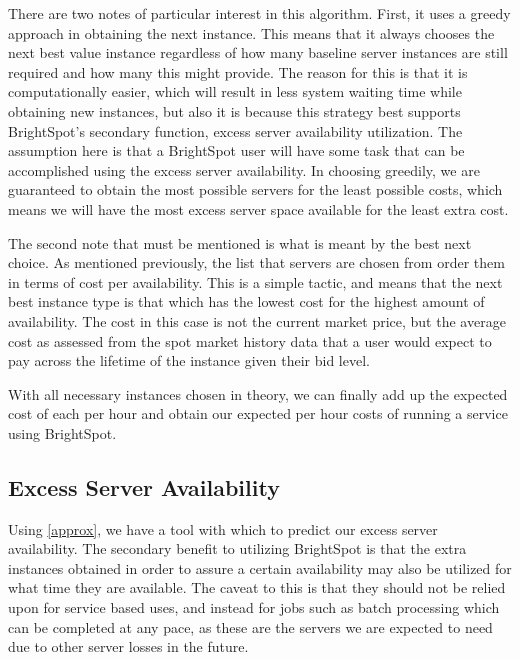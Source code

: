 \documentclass[thesis,proposal]{umassthesis}  %
\begin{document}
There are two notes of particular interest in this algorithm. First, it uses a greedy approach in obtaining the next instance. This means that it always chooses the next best value instance regardless of how many baseline server instances are still required and how many this might provide. The reason for this is that it is computationally easier, which will result in less system waiting time while obtaining new instances, but also it is because this strategy best supports BrightSpot's secondary function, excess server availability utilization. The assumption here is that a BrightSpot user will have some task that can be accomplished using the excess server availability. In choosing greedily, we are guaranteed to obtain the most possible servers for the least possible costs, which means we will have the most excess server space available for the least extra cost.\par

The second note that must be mentioned is what is meant by the best next choice. As mentioned previously, the list that servers are chosen from order them in terms of cost per availability. This is a simple tactic, and means that the next best instance type is that which has the lowest cost for the highest amount of availability. The cost in this case is not the current market price, but the average cost as assessed from the spot market history data that a user would expect to pay across the lifetime of the instance given their bid level.\par

With all necessary instances chosen in theory, we can finally add up the expected cost of each per hour and obtain our expected per hour costs of running a service using BrightSpot.



\subsection{Excess Server Availability}

Using \eqref{approx}, we have a tool with which to predict our excess server availability. The secondary benefit to utilizing BrightSpot is that the extra instances obtained in order to assure a certain availability may also be utilized for what time they are available. The caveat to this is that they should not be relied upon for service based uses, and instead for jobs such as batch processing which can be completed at any pace, as these are the servers we are expected to need due to other server losses in the future.\par
\end{document}
